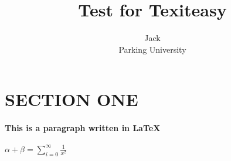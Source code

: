\documentclass{article}
\author{Jack \\
        Parking University }
\title{Test for Texiteasy}
\begin{document}
\maketitle
    \section*{SECTION ONE}
    \paragraph{This is a paragraph written in \LaTeX}    
    $\alpha + \beta = \sum_{i=0}^{\infty}\frac{1}{x^2}$
\end{document}
